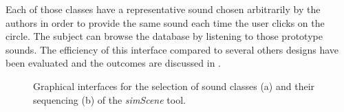 \documentclass[twoside,twocolumn]{article}
\begin{document}

Each of those classes have a representative sound chosen arbitrarily by the authors in order to provide the same sound each time the user clicks on the circle. The subject can browse the database by listening to those prototype sounds. The efficiency of this interface compared to several others designs have been evaluated and the outcomes are discussed in \cite{lafay2016JAES}.

\begin{figure}[t]
        \myfloatalign
         \par
       \caption{Graphical interfaces for the selection of sound classes (a) and their sequencing (b) of the \emph{simScene} tool.}
\end{figure}
\end{document}
